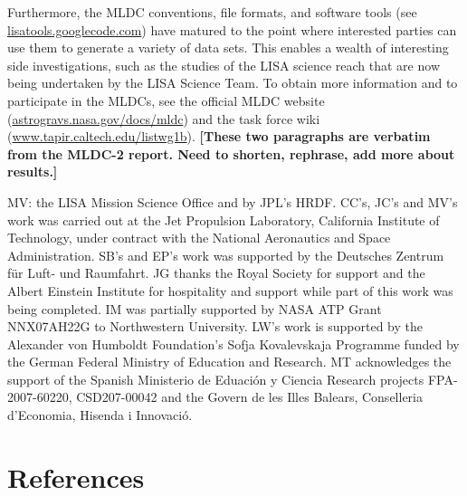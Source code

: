 \documentclass{iopart}
\begin{document}
Furthermore, the MLDC conventions, file formats, and software tools (see \url{lisatools.googlecode.com}) have matured to the point where interested parties can use them to generate a variety of data sets. This enables a wealth of interesting side investigations, such as the studies of the LISA science reach that are now being undertaken by the LISA Science Team. To obtain more information and to participate in the MLDCs, see the official MLDC website (\url{astrogravs.nasa.gov/docs/mldc}) and the task force wiki (\url{www.tapir.caltech.edu/listwg1b}).
\textbf{[These two paragraphs are verbatim from the MLDC-2 report. Need to shorten, rephrase, add more about results.]}

\ack

MV: the LISA Mission Science Office and by JPL's HRDF.
CC's, JC's and MV's work was carried out at the Jet Propulsion Laboratory, California Institute of Technology, under contract with the National Aeronautics and Space Administration.
SB's and EP's work was supported by the Deutsches Zentrum f\"ur Luft- und Raumfahrt.
JG thanks the Royal Society for support and the Albert Einstein
Institute for hospitality and support while part of this work was
being completed. IM was partially supported by NASA ATP Grant
NNX07AH22G to Northwestern University. LW's work is supported by the
Alexander von Humboldt Foundation's Sofja Kovalevskaja Programme
funded by the German Federal Ministry of Education and Research.
MT acknowledges the support of the Spanish Ministerio de Eduaci\'on y
Ciencia Research projects FPA-2007-60220, CSD207-00042 and the Govern
de les Illes Balears, Conselleria d'Economia, Hisenda i Innovaci\'o.



\section*{References}
\end{document}
